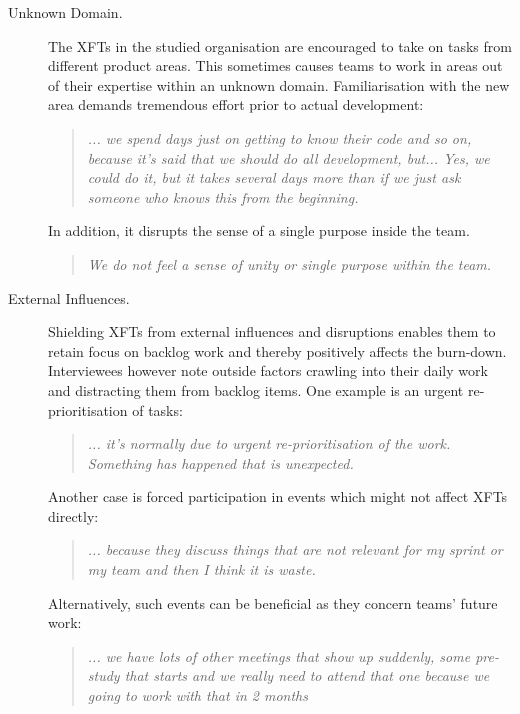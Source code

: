 \begin{description}
    \item [Unknown Domain.] The \acp{XFT} in the studied organisation are encouraged to take on tasks from different product areas. This sometimes causes teams to work in areas out of their expertise within an unknown domain. Familiarisation with the new area demands tremendous effort prior to actual development:

      \begin{quote}\itshape ... we spend days just on getting to know their code and so on, because it's said that we should do all development, but... Yes, we could do it, but it takes several days more than if we just ask someone who knows this from the beginning.
      \end{quote}

   In addition, it disrupts the sense of a single purpose inside the team.

      \begin{quote}\itshape We do not feel a sense of unity or single purpose within the team.
      \end{quote}

   \item [External Influences.] Shielding \acp{XFT} from external influences and disruptions enables them to retain focus on backlog work and thereby positively affects the burn-down. Interviewees however note outside factors crawling into their daily work and distracting them from backlog items. One example is an urgent re-prioritisation of tasks:
    
      \begin{quote}\itshape... it’s normally due to urgent re-prioritisation of the work. Something has happened that is unexpected.
      \end{quote}

   Another case is forced participation in events which might not affect \acp{XFT} directly:

      \begin{quote}\itshape... because they discuss things that are not relevant for my sprint or my team and then I think it is waste.
      \end{quote}

   Alternatively, such events can be beneficial as they concern teams' future work:

      \begin{quote}\itshape ... we have lots of other meetings that show up suddenly, some pre-study that starts and we really need to attend that one because we going to work with that in 2 months
      \end{quote}


\end{description}
